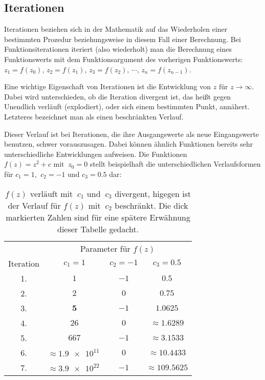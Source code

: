 \subsection{Iterationen}\label{subsec:iterations}

Iterationen beziehen sich in der Mathematik auf das Wiederholen einer bestimmten
Prozedur beziehungsweise in diesem Fall einer Berechnung.
Bei Funktionsiterationen iteriert (also wiederholt) man die Berechnung eines
Funktionswerts mit dem Funktionsargument des vorherigen Funktionswerts:
$z_1 = f(z_0),\, z_2 = f(z_1),\, z_3 = f(z_2),\, \cdots,\, z_n = f(z_{n-1})$.

Eine wichtige Eigenschaft von Iterationen ist die Entwicklung von
$z \text{ für } z \to \infty$.
Dabei wird unterschieden, ob die Iteration divergent ist,
das heißt gegen Unendlich verl\"auft (\glqq explodiert\grqq),
oder sich einem bestimmten Punkt, ann\"ahert.
Letzteres bezeichnet man als einen beschränkten Verlauf.

Dieser Verlauf ist bei Iterationen, die ihre Ausgangswerte als neue Eingangswerte
benutzen, schwer vorauszusagen.
Dabei k\"onnen \"ahnlich Funktionen bereits sehr unterschiedliche Entwicklungen aufweisen.
Die Funktionen $f(z) = z^2 + c \text{ mit }\ z_0 = 0$ stellt beispielhaft
die unterschiedlichen Verlaufsformen für
$c_1 = 1 \text{, }\ c_2 = -1 \text{ und } c_3 = 0.5$ dar:

\begin{table}[h!]
  \centering
  \begin{tabular}{@{}cccc@{}}
    \toprule
    & \multicolumn{3}{c}{Parameter für $f(z)$} \\
    \cmidrule(lr){2-4}
    Iteration & $ c_1 = 1$ & $ c_2 = -1$ & $ c_3 = 0.5$ \\
    \midrule
    1. & $1$ & $-1$ & $0.5$ \\
    2. & $2$ & $0$ & $0.75$ \\
    3. & $\boldsymbol{5}$ & $-1$ & $1.0625$ \\
    4. & $26$ & $0$ & $\approx 1.6289 $ \\
    5. & $667$ & $-1$ & $\approx \boldsymbol{3.1533} $ \\
    6. & $\approx \num{1,9e11}\ $ & $0$ & $\approx 10.4433 $ \\
    7. & $\approx \num{3,9e22}\ $ & $-1$ & $\approx 109.5625 $ \\
    \bottomrule
  \end{tabular}
  \caption{
    $f(z) \text{ verl\"auft mit }\ c_1 \text{ und }\ c_3$ divergent,
    higegen ist der Verlauf f\"ur $f(z) \text{ mit }\ c_2$ beschr\"ankt.
    Die dick markierten Zahlen sind für eine spätere Erwähnung dieser Tabelle
    gedacht.
  }
  \label{tab:iterations-example}
\end{table}